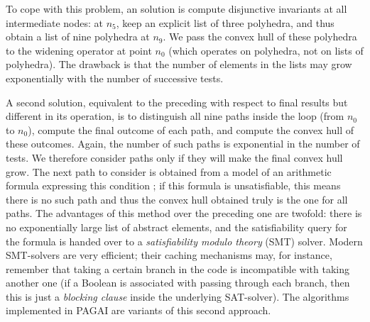 \documentclass{entcs}
\begin{document}
To cope with this problem, an solution is compute disjunctive invariants at all intermediate nodes: at $n_5$, keep an explicit list of three polyhedra, and thus obtain a list of nine polyhedra at $n_9$. We pass the convex hull of these polyhedra to the widening operator at point $n_0$ (which operates on polyhedra, not on lists of polyhedra). The drawback is that the number of elements in the lists may grow exponentially with the number of successive tests.

A second solution, equivalent to the preceding with respect to final results but different in its operation, is to distinguish all nine paths inside the loop (from $n_0$ to $n_0$), compute the final outcome of each path, and compute the convex hull of these outcomes.
Again, the number of such paths is exponential in the number of tests.
We therefore consider paths only if they will make the final convex hull grow.
The next path to consider is obtained from a model of an arithmetic formula expressing this condition \cite{Monniaux_Gonnord_SAS11}; if this formula is unsatisfiable, this means there is no such path and thus the convex hull obtained truly is the one for all paths.
The advantages of this method over the preceding one are twofold: there is no exponentially large list of abstract elements, and the satisfiability query for the formula is handed over to a \emph{satisfiability modulo theory} (SMT) solver.
Modern SMT-solvers are very efficient; their caching mechanisms may, for instance, remember that taking a certain branch in the code is incompatible with taking another one (if a Boolean is associated with passing through each branch, then this is just a \emph{blocking clause} inside the underlying SAT-solver).
The algorithms implemented in PAGAI are variants of this second approach.
\end{document}
